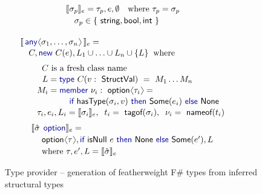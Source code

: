 \documentclass[10pt,preprint,blind,clearpagebib]{sigplanconf}
\newcommand{\langl}{\begin{picture}(4.5,7)
\put(1.1,2.5){\rotatebox{60}{\line(1,0){5.5}}}
\put(1.1,2.5){\rotatebox{300}{\line(1,0){5.5}}}
\end{picture}}
\newcommand{\rangl}{\begin{picture}(4.5,7)
\put(.9,2.5){\rotatebox{120}{\line(1,0){5.5}}}
\put(.9,2.5){\rotatebox{240}{\line(1,0){5.5}}}
\end{picture}}
\newcommand{\kvd}[1]{\textnormal{\textcolor{kvdclr}{\sffamily #1}}}
\newcommand{\ident}[1]{\textnormal{\sffamily #1}}
\newcommand{\tytagof}{\ident{tagof}}
\newcommand{\nameoftag}{\ident{nameof}}
\newcommand{\sem}[1]{\llbracket #1 \rrbracket}
\begin{document}
\begin{figure}
\begin{multicols}{2}
\noindent
\begin{equation*}
\hspace{-2.5em}
\begin{array}{l}
 \sem{\sigma_p}_e = \tau_p,e,\emptyset\quad\textnormal{where}~\tau_p = \sigma_p \\[0.2em]
\quad\sigma_p \in  \{~ \ident{string},\ident{bool},\ident{int}~\}\\[0.6em]
\end{array}
\end{equation*}
%
\begin{equation*}
\hspace{-2.5em}
\begin{array}{l}
 \sem{\,\kvd{any}\langl\sigma_1, \ldots, \sigma_n\rangl\,}_e = \\[0.1em]
 \quad C, \kvd{new}~C(e), L_1\cup\ldots\cup L_n\cup\{ L \}\;\;\textnormal{where}\\[0.6em]
 \qquad \;\;C~\textnormal{is a fresh class name} \\[0.1em]
 \qquad \;\,\,L = \kvd{type}~C(v:\ident{StructVal})~=~M_1\ldots M_n \\[0.1em]
 \qquad M_i = \kvd{member}~\nu_i:\ident{option}\langl\tau_i\rangl=\\[0.1em]
 \hspace{5.8em}  \kvd{if}~\ident{hasType}(\sigma_i, v)~\kvd{then}~
     \ident{Some}(e_i)~\kvd{else}~\ident{None} \\[0.1em]
 \qquad \tau_i, e_i, L_i = \sem{\sigma_i}_e,\;\; t_i = \tytagof{(\sigma_i)},\;\; \nu_i=\nameoftag{(t_i)}
\end{array}
\end{equation*}
%
\begin{equation*}
\hspace{-2.5em}
\begin{array}{l}
 \sem{\hat{\sigma}\;\,\kvd{option}}_e = \\[0.2em]
 \hspace{1.25em} \ident{option}\langl\tau\rangl, \kvd{if}~\ident{isNull}~e~\kvd{then}~\ident{None}~\kvd{else}~\ident{Some}(e'), L\\[0.2em] 
 \hspace{1.25em} \textnormal{where}~\tau, e', L = \sem{\hat{\sigma}}_e
\end{array}
\end{equation*}
\end{multicols}

\caption{Type provider -- generation of featherweight F\# types from inferred structural types}
\label{fig:tp-generation}
\vspace{-0.5em}
\end{figure}
\end{document}
